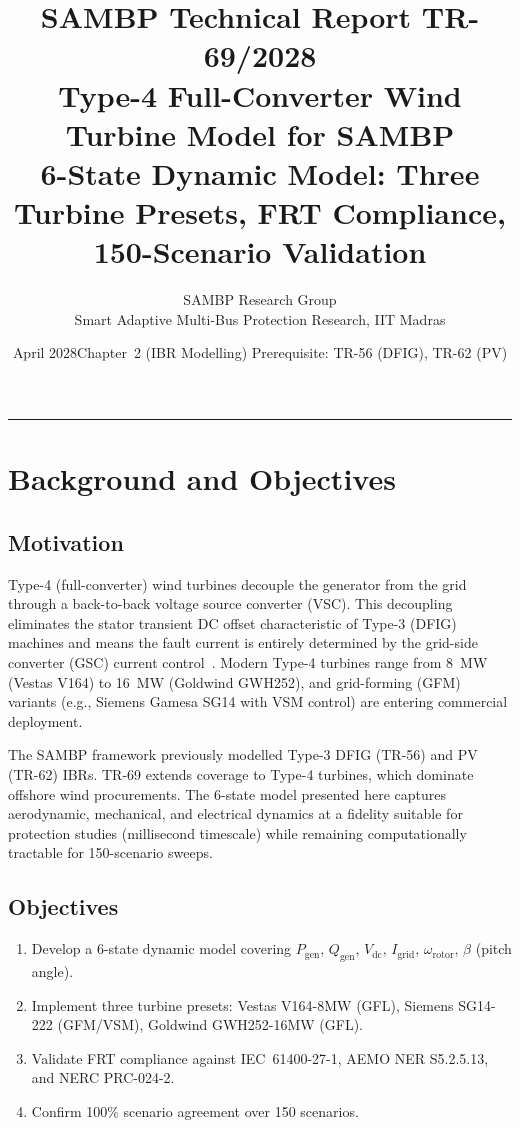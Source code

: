 \documentclass[11pt, a4paper]{article}
\title{\textbf{\textsf{\color{sambpblue}SAMBP Technical Report TR-69/2028}}\\[6pt]
  \Large Type-4 Full-Converter Wind Turbine Model for SAMBP\\[4pt]
  \normalsize 6-State Dynamic Model: Three Turbine Presets,
  FRT Compliance, 150-Scenario Validation}
\author{SAMBP Research Group\\[2pt]
  \small Smart Adaptive Multi-Bus Protection Research, IIT Madras}
\date{April 2028\quad\textbar\quad Chapter~2 (IBR Modelling)\quad\textbar\quad
  Prerequisite: TR-56 (DFIG), TR-62 (PV)}
\begin{document}
\maketitle
\tableofcontents
\vspace{6pt}\hrule\vspace{10pt}

\section{Background and Objectives}
\label{sec:background}

\subsection{Motivation}

Type-4 (full-converter) wind turbines decouple the generator from the grid
through a back-to-back voltage source converter (VSC). This decoupling
eliminates the stator transient DC offset characteristic of Type-3 (DFIG)
machines and means the fault current is entirely determined by the grid-side
converter (GSC) current control~\cite{Erlich2007}. Modern Type-4 turbines range
from 8~MW (Vestas V164) to 16~MW (Goldwind GWH252), and grid-forming (GFM)
variants (e.g., Siemens Gamesa SG14 with VSM control) are entering commercial
deployment.

The SAMBP framework previously modelled Type-3 DFIG (TR-56) and PV (TR-62) IBRs.
TR-69 extends coverage to Type-4 turbines, which dominate offshore wind
procurements. The 6-state model presented here captures aerodynamic, mechanical,
and electrical dynamics at a fidelity suitable for protection studies (millisecond
timescale) while remaining computationally tractable for 150-scenario sweeps.

\subsection{Objectives}

\begin{enumerate}
  \item Develop a 6-state dynamic model covering $P_{\mathrm{gen}},\, Q_{\mathrm{gen}},
    \, V_{\mathrm{dc}},\, I_{\mathrm{grid}},\, \omega_{\mathrm{rotor}},
    \, \beta$ (pitch angle).
  \item Implement three turbine presets: Vestas V164-8MW (GFL),
    Siemens SG14-222 (GFM/VSM), Goldwind GWH252-16MW (GFL).
  \item Validate FRT compliance against IEC~61400-27-1, AEMO NER S5.2.5.13,
    and NERC PRC-024-2.
  \item Confirm 100\% scenario agreement over 150 scenarios.
\end{enumerate}
\end{document}

